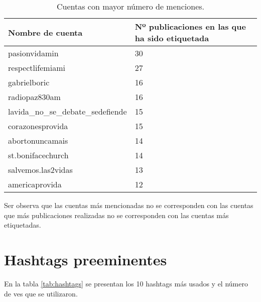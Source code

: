 \documentclass{article}
\begin{document}
\begin{table}[ht!]
\centering
\begin{tabular}{|l|l|}
\hline
Nombre de cuenta                   & Nº publicaciones en las que ha sido etiquetada \\ \hline
pasionvidamin                      & 30                                      \\ \hline
respectlifemiami                   & 27                                      \\ \hline
gabrielboric                       & 16                                      \\ \hline
radiopaz830am                      & 16                                      \\ \hline
lavida\_no\_se\_debate\_sedefiende & 15                                      \\ \hline
corazonesprovida                   & 15                                      \\ \hline
abortonuncamais                    & 14                                      \\ \hline
st.bonifacechurch                  & 14                                      \\ \hline
salvemos.las2vidas                 & 13                                      \\ \hline
americaprovida                     & 12                                      \\ \hline
\end{tabular}
\caption{Cuentas con mayor número de menciones.}
\label{tab:menciones}
\end{table}

Ser observa que las cuentas más mencionadas no se corresponden con las cuentas que más publicaciones realizadas no se corresponden con las cuentas más etiquetadas.

\section{Hashtags preeminentes}
En la tabla \ref{tab:hashtags} se presentan los 10 hashtags más usados y el número de ves que se utilizaron.
\end{document}
